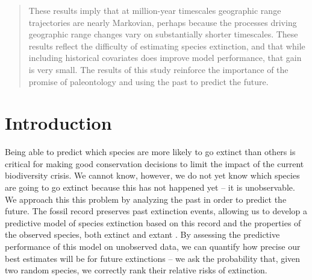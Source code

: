 \documentclass[12pt,letterpaper]{article}
\begin{document}
\begin{abstract}
  These results imply that at million-year timescales geographic range trajectories are nearly Markovian, perhaps because the processes driving geographic range changes vary on substantially shorter timescales. 
  These results reflect the difficulty of estimating species extinction, and that while including historical covariates does improve model performance, that gain is very small. 
  The results of this study reinforce the importance of the promise of paleontology and using the past to predict the future.
\end{abstract}


\section{Introduction}

Being able to predict which species are more likely to go extinct than others is critical for making good conservation decisions to limit the impact of the current biodiversity crisis. We cannot know, however, we do not yet know which species are going to go extinct because this has not happened yet -- it is unobservable. We approach this this problem by analyzing the past in order to predict the future. The fossil record preserves past extinction events, allowing us to develop a predictive model of species extinction based on this record and the properties of the observed species, both extinct and extant \citep{Harnik2012,Finnegan2015}. By assessing the predictive performance of this model on unobserved data, we can quantify how precise our best estimates will be for future extinctions -- we ask the probability that, given two random species, we correctly rank their relative risks of extinction.
\end{document}
